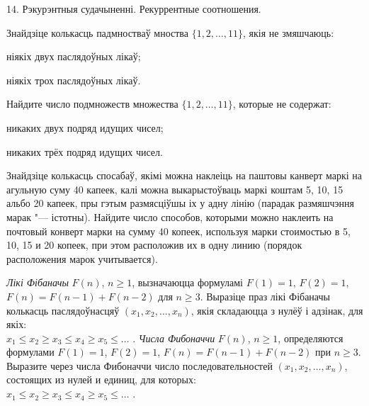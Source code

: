 



\biLangHeader
{14. Рэкурэнтныя судачыненні.}
{Рекуррентные соотношения.}

\begin{problemList}

\problemItemSimple
{Знайдзіце колькасць падмностваў мноства $\{1, 2, \ldots, 11\}$, якія не змяшчаюць:
\begin{belarusianEnumerate}
  \item ніякіх двух паслядоўных лікаў;
  \item ніякіх трох паслядоўных лікаў.
\end{belarusianEnumerate}}
{Найдите число подмножеств множества $\{1, 2, \ldots, 11\}$, которые не содержат:
\begin{belarusianEnumerate}
  \item никаких двух подряд идущих чисел;
  \item никаких трёх подряд идущих чисел.
\end{belarusianEnumerate}}

\bigskip

\problemItemSimple
{Знайдзіце колькасць спосабаў, якімі можна наклеіць на паштовы канверт маркі на
агульную суму 40 капеек, калі можна выкарыстоўваць маркі коштам 5, 10, 15 альбо 20 капеек,
пры гэтым размясціўшы іх у адну лінію (парадак размяшчэння марак "--- істотны).}
{Найдите число способов, которыми можно наклеить на почтовый конверт
марки на сумму 40 копеек, используя марки стоимостью в 5, 10, 15 и 20 копеек,
при этом расположив их в одну линию (порядок расположения марок учитывается).}

\bigskip

\problemItemSimple
{\emph{Лікі Фібаначы} $F(n)$, $n \ge 1$, вызначаюцца формуламі
$F(1) = 1$, $F(2) = 1$, $F(n) = F(n - 1) + F(n - 2)$ для $n \ge 3$.
Выразіце праз лікі Фібаначы колькасць паслядоўнасцяў $(x_1, x_2, \ldots, x_n)$,
якія складаюцца з нулёў і адзінак, для якіх: \\
$x_1 \le x_2 \ge x_3 \le x_4 \ge x_5 \le \ldots\,\,$.}
{\emph{Числа Фибоначчи} $F(n)$, $n \ge 1$, определяются формулами
$F(1) = 1$, $F(2) = 1$, $F(n) = F(n - 1) + F(n - 2)$ при $n \ge 3$. Выразите
через числа Фибоначчи число последовательностей $(x_1, x_2, \ldots, x_n)$,
состоящих из нулей и единиц, для которых: \\
$x_1 \le x_2 \ge x_3 \le x_4 \ge x_5 \le \ldots\,\,$.}

\bigskip


\end{problemList}
